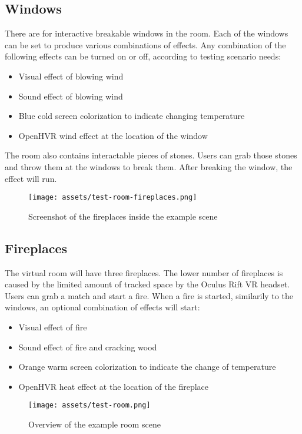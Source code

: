 \hypertarget{x-windows}{\subsection{Windows}}
There are for interactive breakable windows in the room. Each of the
windows can be set to produce various combinations of effects. Any combination
of the following effects can be turned on or off, according to testing
scenario needs:

\begin{itemize}
    \itemsep0em
\item Visual effect of blowing wind
\item Sound effect of blowing wind
\item Blue cold screen colorization to indicate changing temperature
\item OpenHVR wind effect at the location of the window
\end{itemize}

The room also contains interactable pieces of stones. Users can grab those
stones and throw them at the windows to break them. After breaking the window,
the effect will run.

\newpage

\begin{figure}[h]{}
\centering\texttt{[image: assets/test-room-fireplaces.png]}
\caption{Screenshot of the fireplaces inside the example scene}
\end{figure}

\hypertarget{x-fireplaces}{\subsection{Fireplaces}}
The virtual room will have three fireplaces. The lower number of fireplaces 
is caused by the limited amount of tracked space by the Oculus Rift VR headset.
Users can grab a match and start a fire. 
When a fire is started, similarily to the windows, an optional
combination of effects will start:

\begin{itemize}
    \itemsep0em
\item Visual effect of fire
\item Sound effect of fire and cracking wood
\item Orange warm screen colorization to indicate the change of temperature
\item OpenHVR heat effect at the location of the fireplace
\end{itemize}

\newpage

\begin{figure}[p]{}
\centering\texttt{[image: assets/test-room.png]}
\caption{Overview of the example room scene}
\label{exenv}
\end{figure}